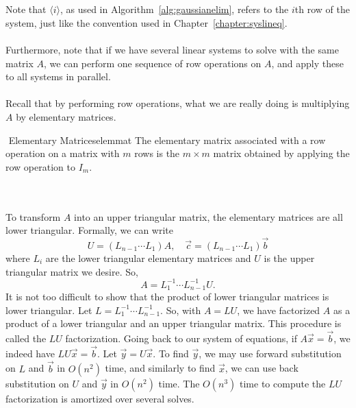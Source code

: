         \vphantom
        \\
        \\
        Note that \(\langle i\rangle\), as used in Algorithm~\ref{alg:gaussianelim}, refers to the \(i\)th row of the system, just like the convention used in Chapter~\ref{chapter:syslineq}.
        \\
        \\
        Furthermore, note that if we have several linear systems to solve with the same matrix \(A\), we can perform one sequence of row operations on \(A\), and apply these to all systems in parallel. 
        \\
        \\
        Recall that by performing row operations, what we are really doing is multiplying \(A\) by elementary matrices.
        \begin{definition}{\Stop\,\,Elementary Matrices}{elemmat}
            The elementary matrix associated with a row operation on a matrix with \(m\) rows is the \(m\times m\) matrix obtained by applying the row operation to \(I_m\).
        \end{definition}
        \vphantom
        \\
        \\
        To transform \(A\) into an upper triangular matrix, the elementary matrices are all lower triangular. Formally, we can write
        \begin{equation*}
            U=(L_{n-1}\cdots L_1)A, \quad \vec{c}=(L_{n-1}\cdots L_1)\vec{b}
        \end{equation*} 
        where \(L_i\) are the lower triangular elementary matrices and \(U\) is the upper triangular matrix we desire. So,
        \begin{equation*}
            A=L_1^{-1}\cdots L_{n-1}^{-1}U.
        \end{equation*}
        It is not too difficult to show that the product of lower triangular matrices is lower triangular. Let \(L=L_1^{-1}\cdots L_{n-1}^{-1}\). So, with \(A=LU\), we have factorized \(A\) as a product of a lower triangular and an upper triangular matrix. This procedure is called the \(LU\) factorization. Going back to our system of equations, if \(A\vec{x}=\vec{b}\), we indeed have \(LU\vec{x}=\vec{b}\). Let \(\vec{y}=U\vec{x}\). To find \(\vec{y}\), we may use forward substitution on \(L\) and \(\vec{b}\) in \(O(n^2)\) time, and similarly to find \(\vec{x}\), we can use back substitution on \(U\) and \(\vec{y}\) in \(O(n^2)\) time. The \(O(n^3)\) time to compute the \(LU\) factorization is amortized over several solves.

